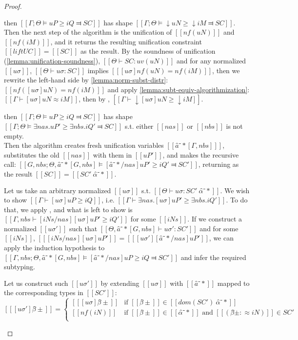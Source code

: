 \begin{proof}
\begin{caseof}
    \item \label{case:pos-subt-soundness:shift} 
         then
        $[[Γ ; Θ ⊨ uP ≥ iQ ⫤ SC]]$ has shape $[[Γ;Θ ⊨ ↓uN ≥ ↓iM ⫤ SC]]$.\\
        Then the next step of the algorithm is the unification of $[[nf(uN)]]$ and $[[nf(iM)]]$,
        and it returns the resulting unification constraint $[[lift UC]] = [[SC]]$ as the result.
        By the soundness of unification (\cref{lemma:unification-soundness}),
        $[[Θ ⊢ SC : uv(uN)]]$ and for any normalized $[[uσ]]$, $[[ Θ ⊢ uσ : SC ]]$
        implies $[[ [uσ]nf(uN) = nf(iM) ]]$, 
        then we rewrite the left-hand side by \cref{lemma:norm-subst-distr}:
        $[[ nf([uσ]uN) = nf(iM) ]]$ and apply \cref{lemma:subt-equiv-algorithmization}:
        $[[Γ ⊢ [uσ]uN ≈ iM]]$, then by ,
        $[[Γ ⊢ ↓[uσ]uN ≥ ↓iM]]$.
    
    \item \label{case:pos-subt-soundness:exists}
        then
        $[[Γ ; Θ ⊨ uP ≥ iQ ⫤ SC]]$ has shape $[[Γ;Θ ⊨ ∃nas.uP' ≥ ∃nbs.iQ' ⫤ SC]]$ s.t. either 
        $[[nas]]$ or $[[nbs]]$ is not empty.\\
        Then the algorithm creates fresh unification variables $[[â⁻*[Γ,nbs] ]]$, 
        substitutes the old $[[nas]]$ with them in $[[uP']]$, and makes the recursive call:
        $[[G, nbs; Θ, â⁻*[G, nbs] ⊨ [â⁻*/nas] uP' ≥ iQ' ⫤ SC']]$, returning as the result
        $[[SC]] = [[SC' \ {α̂⁻*}]]$.

        Let us take an arbitrary normalized $[[uσ]]$ s.t. $[[ Θ   ⊢ uσ : SC' \ {α̂⁻*} ]]$.
        We wish to show $[[Γ ⊢ [uσ]uP ≥ iQ]]$, i.e. $[[Γ ⊢ ∃nas.[uσ]uP' ≥ ∃nbs.iQ']]$.
        To do that, we apply , and what is left to show is
        $[[Γ, nbs ⊢ [iNs/nas][uσ]uP' ≥ iQ']]$ for some $[[iNs]]$.
        If we construct a normalized $[[uσ']]$ such that $[[Θ, â⁻*[G, nbs] ⊢ uσ' : SC']]$
        and for some $[[iNs]]$, $[[ [iNs/nas][uσ]uP' ]] = [[ [uσ'][â⁻*/nas]uP' ]]$,
        we can apply the induction hypothesis to 
        $[[Γ, nbs; Θ, â⁻*[G, nbs] ⊨ [â⁻*/nas] uP ≥ iQ ⫤ SC']]$ and infer 
        the required subtyping.

        Let us construct such $[[uσ']]$ by extending $[[uσ]]$ with $[[â⁻*]]$
        mapped to the corresponding types in $[[SC']]$:
        $$
        [[ [uσ']β̂± ]]  = 
            \begin{cases}
               [[ [uσ]β̂± ]] & \text{if } [[β̂±]] \in [[dom(SC') \ {α̂⁻*}]]  \\
               [[ nf(iN) ]] & \text{if } [[β̂±]] \in [[α̂⁻*]] \text{ and } [[(β̂± :≈ iN)]] \in SC' \\
            \end{cases}
        $$


\end{caseof}
\end{proof}
